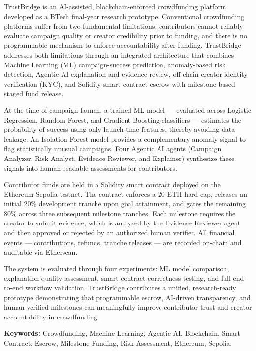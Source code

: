 TrustBridge is an AI-assisted, blockchain-enforced crowdfunding platform developed as a BTech final-year research prototype. Conventional crowdfunding platforms suffer from two fundamental limitations: contributors cannot reliably evaluate campaign quality or creator credibility prior to funding, and there is no programmable mechanism to enforce accountability after funding. TrustBridge addresses both limitations through an integrated architecture that combines Machine Learning (ML) campaign-success prediction, anomaly-based risk detection, Agentic AI explanation and evidence review, off-chain creator identity verification (KYC), and Solidity smart-contract escrow with milestone-based staged fund release.

At the time of campaign launch, a trained ML model --- evaluated across Logistic Regression, Random Forest, and Gradient Boosting classifiers --- estimates the probability of success using only launch-time features, thereby avoiding data leakage. An Isolation Forest model provides a complementary anomaly signal to flag statistically unusual campaigns. Four Agentic AI agents (Campaign Analyzer, Risk Analyst, Evidence Reviewer, and Explainer) synthesize these signals into human-readable assessments for contributors.

Contributor funds are held in a Solidity smart contract deployed on the Ethereum Sepolia testnet. The contract enforces a 20 ETH hard cap, releases an initial 20\% development tranche upon goal attainment, and gates the remaining 80\% across three subsequent milestone tranches. Each milestone requires the creator to submit evidence, which is analyzed by the Evidence Reviewer agent and then approved or rejected by an authorized human verifier. All financial events --- contributions, refunds, tranche releases --- are recorded on-chain and auditable via Etherscan.

The system is evaluated through four experiments: ML model comparison, explanation quality assessment, smart-contract correctness testing, and full end-to-end workflow validation. TrustBridge contributes a unified, research-ready prototype demonstrating that programmable escrow, AI-driven transparency, and human-verified milestones can meaningfully improve contributor trust and creator accountability in crowdfunding.

\vspace{5mm}
\noindent\textbf{Keywords:} Crowdfunding, Machine Learning, Agentic AI, Blockchain, Smart Contract, Escrow, Milestone Funding, Risk Assessment, Ethereum, Sepolia.
